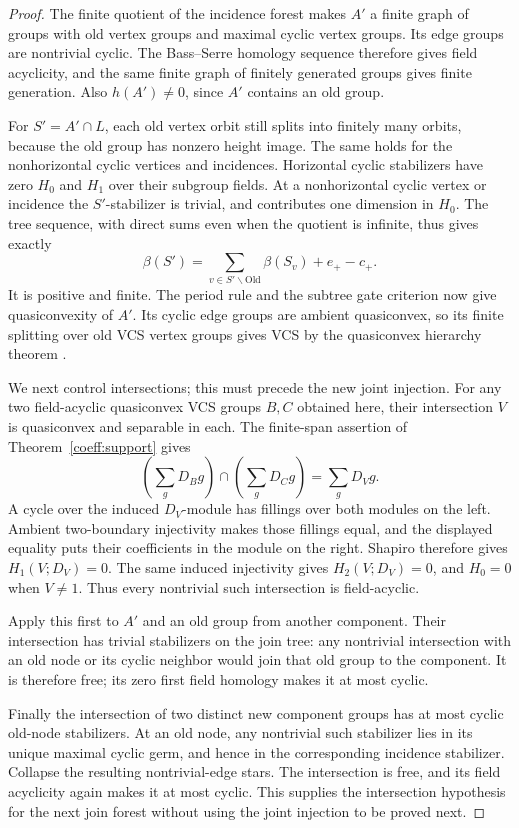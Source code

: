 \begin{proof}
The finite quotient of the incidence forest makes $A'$ a finite graph
of groups with old vertex groups and maximal cyclic vertex groups.
Its edge groups are nontrivial cyclic. The Bass--Serre homology
sequence therefore gives field acyclicity, and the same finite graph
of finitely generated groups gives finite generation. Also
$h(A')\ne0$, since $A'$ contains an old group.

For $S'=A'\cap L$, each old vertex orbit still splits into finitely
many orbits, because the old group has nonzero height image. The
same holds for the nonhorizontal cyclic vertices and incidences.
Horizontal cyclic stabilizers have zero $H_0$ and $H_1$ over their
subgroup fields. At a nonhorizontal cyclic vertex or incidence the
$S'$-stabilizer is trivial, and contributes one dimension in $H_0$.
The tree sequence, with direct sums even when the quotient is infinite,
thus gives exactly
\[
 \beta(S')=\sum_{v\in S'\backslash\mathrm{Old}}\beta(S_v)+e_+-c_+.
\]
It is positive and finite. The period rule and the subtree gate
criterion now give quasiconvexity of $A'$. Its cyclic edge groups
are ambient quasiconvex, so its finite splitting over old VCS vertex
groups gives VCS by the quasiconvex hierarchy theorem
\cite{Wise2021}.

We next control intersections; this must precede the new joint
injection. For any two field-acyclic quasiconvex VCS groups $B,C$
obtained here, their intersection $V$ is quasiconvex and separable in
each. The finite-span assertion of Theorem~\ref{coeff:support} gives
\[
 \left(\sum_gD_Bg\right)\cap\left(\sum_gD_Cg\right)
       =\sum_gD_Vg.
\]
A cycle over the induced $D_V$-module has fillings over both modules
on the left. Ambient two-boundary injectivity makes those fillings
equal, and the displayed equality puts their coefficients in the
module on the right. Shapiro therefore gives $H_1(V;D_V)=0$.
The same induced injectivity gives $H_2(V;D_V)=0$, and $H_0=0$
when $V\ne1$. Thus every nontrivial such intersection is field-acyclic.

Apply this first to $A'$ and an old group from another component.
Their intersection has trivial stabilizers on the join tree: any
nontrivial intersection with an old node or its cyclic neighbor
would join that old group to the component. It is therefore free;
its zero first field homology makes it at most cyclic.

Finally the intersection of two distinct new component groups has
at most cyclic old-node stabilizers. At an old node, any nontrivial
such stabilizer lies in its unique maximal cyclic germ, and hence in
the corresponding incidence stabilizer. Collapse the resulting
nontrivial-edge stars. The intersection is free, and its field
acyclicity again makes it at most cyclic. This supplies the
intersection hypothesis for the next join forest without using the
joint injection to be proved next.
\end{proof}

